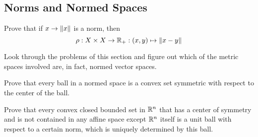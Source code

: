 \subsection{Norms and Normed Spaces}

\begin{minorEx}
    Prove that if $x \to \Vert x\Vert$ is a norm, then
    \[
        \rho : X \times X \to \mathbb{R}_+ : (x,y) \mapsto \Vert x - y\Vert
    \]
\end{minorEx}

\begin{minorEx}
    Look through the problems of this section and figure out which of the metric
    spaces involved are, in fact, normed vector spaces.
\end{minorEx}

\begin{minorEx}
    Prove that every ball in a normed space is a convex set symmetric with
    respect to the center of the ball.
\end{minorEx}

\begin{minorEx}
    Prove that every convex closed bounded set in $\mathbb{R}^n$ that has a center of
    symmetry and is not contained in any affine space except $\mathbb{R}^n$ itself is a
    unit ball with respect to a certain norm, which is uniquely determined by
    this ball.
\end{minorEx}
